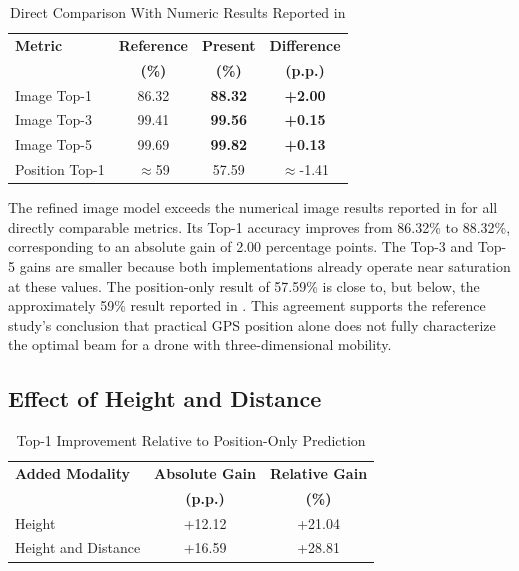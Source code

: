 \begin{table}[t]
\caption{Direct Comparison With Numeric Results Reported in
\cite{charan2022drone}}
\label{tab:reference_comparison}
\centering
\begin{tabular}{lccc}
\hline
\textbf{Metric} & \textbf{Reference} & \textbf{Present} &
\textbf{Difference} \\
 & \textbf{(\%)} & \textbf{(\%)} & \textbf{(p.p.)} \\
\hline
Image Top-1 & 86.32 & \textbf{88.32} & \textbf{+2.00} \\
Image Top-3 & 99.41 & \textbf{99.56} & \textbf{+0.15} \\
Image Top-5 & 99.69 & \textbf{99.82} & \textbf{+0.13} \\
Position Top-1 & $\approx$59 & 57.59 & $\approx$-1.41 \\
\hline
\end{tabular}
\end{table}

The refined image model exceeds the numerical image results reported in
\cite{charan2022drone} for all directly comparable metrics. Its Top-1
accuracy improves from 86.32\% to 88.32\%, corresponding to an absolute gain
of 2.00 percentage points. The Top-3 and Top-5 gains are smaller because both
implementations already operate near saturation at these values. The
position-only result of 57.59\% is close to, but below, the approximately 59\%
result reported in \cite{charan2022drone}. This agreement supports the
reference study's conclusion that practical GPS position alone does not fully
characterize the optimal beam for a drone with three-dimensional mobility.

\subsection{Effect of Height and Distance}

\begin{table}[t]
\caption{Top-1 Improvement Relative to Position-Only Prediction}
\label{tab:modality_gain}
\centering
\begin{tabular}{lcc}
\hline
\textbf{Added Modality} & \textbf{Absolute Gain} & \textbf{Relative Gain} \\
 & \textbf{(p.p.)} & \textbf{(\%)} \\
\hline
Height & +12.12 & +21.04 \\
Height and Distance & +16.59 & +28.81 \\
\hline
\end{tabular}
\end{table}

